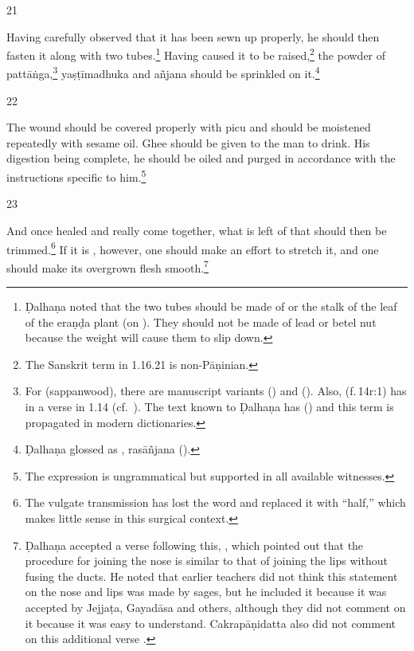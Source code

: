 \begin{translation}
\item[21] 
\begin{em}
Having carefully observed that it has been sewn up properly, he should then
fasten it along with two tubes.\footnote{Ḍalhaṇa noted that the two tubes
    should be made of  or the stalk of the leaf of the
    \gls{eraṇḍa} plant (on ). They should not be made of lead or betel
    nut because the weight will cause them to slip down.} Having caused it to be
    raised,\footnote{The Sanskrit term  in 1.16.21 is
        non-Pāṇinian.} the powder of \gls{pattāṅga},\footnote{\label{pattanga} For
             (sappanwood), there are manuscript variants 
            () and  ().  Also,  (f.\,14r:1) has  in
            a verse in 1.14 (cf.\ ). The text known to Ḍalhaṇa has
             () and this term is propagated in modern
            dictionaries.} \gls{yaṣṭīmadhuka} %
            and \gls{añjana} should be sprinkled on it.\footnote{Ḍalhaṇa
                glossed  as , \gls{rasāñjana}
                (\cite[81]{vulgate}).}
\end{em}    
\item[22] 
\begin{em}
 The wound should be covered properly with \gls{picu} and should be
moistened repeatedly with sesame oil.  Ghee should be given to the man to drink. 
His digestion being complete, he should be oiled and purged in accordance with
the instructions specific to him.\footnote{The expression 
    is ungrammatical but supported in all available witnesses.}
\end{em}
    
\item[23] %
\begin{em}
And once healed and really come together, what is left of that
 should then be trimmed.\footnote{The vulgate
    transmission has lost the word  and replaced it with 
    “half,” which makes little sense in this surgical  context.} If it is
    , however, one should make an effort to stretch it,
    and one should make its overgrown flesh smooth.\footnote{Ḍalhaṇa accepted a
        verse following this, , which pointed out that the procedure
        for joining the nose is similar to that of joining the lips without fusing the
        ducts. He noted that earlier teachers did not think this statement on the nose
        and lips was made by sages, but he included it because it was accepted by
        Jejjaṭa, Gayadāsa and others, although they did not comment on it because it
        was easy to understand. Cakrapāṇidatta also did not comment on this additional
        verse \citep[133]{acar-1939}.}

\end{em}    
    
\end{translation}    
